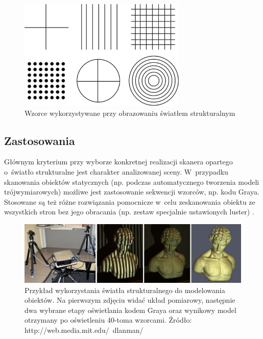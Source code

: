 \begin{figure}[h!]
\centering
\includegraphics[width=8cm]{../../Common/img/struct_patterns}
\caption[Wzorce wykorzystywane przy obrazowaniu światłem strukturalnym]
{Wzorce wykorzystywane przy obrazowaniu światłem strukturalnym}
\label{fig:struct_patterns}
\end{figure}

\subsection{Zastosowania}

Głównym kryterium przy wyborze konkretnej realizacji skanera opartego o~światło
strukturalne jest charakter analizowanej sceny. W~przypadku skanowania obiektów
statycznych (np. podczas automatycznego tworzenia modeli trójwymiarowych)
możliwe jest zastosowanie sekwencji wzorców, np. kodu Graya. Stosowane są też
różne rozwiązania pomocnicze w~celu zeskanowania obiektu ze wszystkich stron bez
jego obracania (np. zestaw specjalnie ustawionych luster) \cite{LanmanCT07}.

\begin{figure}[!ht]
\centering
\includegraphics[width=14cm]{../../Common/img/struct_all}
\caption[Przykład wykorzystania światła strukturalnego do modelowania obiektów]
{Przykład wykorzystania światła strukturalnego do modelowania obiektów. Na
pierwszym zdjęciu widać układ pomiarowy, następnie dwa wybrane etapy oświetlania
kodem Graya oraz wynikowy model otrzymany po oświetleniu 40-toma wzorcami.
Źródło: http://web.media.mit.edu/~dlanman/}
\label{fig:struct_all}
\end{figure}

